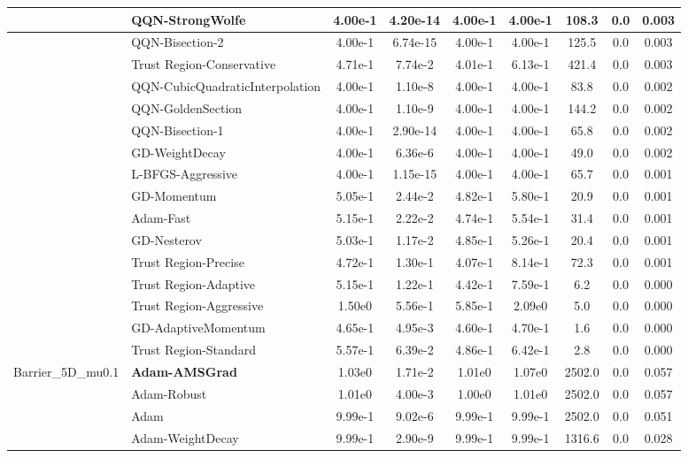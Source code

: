 \documentclass[10pt]{article}
\begin{document}
\begin{longtable}{|l|l|c|c|c|c|c|c|c|}
\hline
 & QQN-StrongWolfe & 4.00e-1 & 4.20e-14 & 4.00e-1 & 4.00e-1 & 108.3 & 0.0 & 0.003 \\
\hline
 & QQN-Bisection-2 & 4.00e-1 & 6.74e-15 & 4.00e-1 & 4.00e-1 & 125.5 & 0.0 & 0.003 \\
\hline
 & Trust Region-Conservative & 4.71e-1 & 7.74e-2 & 4.01e-1 & 6.13e-1 & 421.4 & 0.0 & 0.003 \\
\hline
 & QQN-CubicQuadraticInterpolation & 4.00e-1 & 1.10e-8 & 4.00e-1 & 4.00e-1 & 83.8 & 0.0 & 0.002 \\
\hline
 & QQN-GoldenSection & 4.00e-1 & 1.10e-9 & 4.00e-1 & 4.00e-1 & 144.2 & 0.0 & 0.002 \\
\hline
 & QQN-Bisection-1 & 4.00e-1 & 2.90e-14 & 4.00e-1 & 4.00e-1 & 65.8 & 0.0 & 0.002 \\
\hline
 & GD-WeightDecay & 4.00e-1 & 6.36e-6 & 4.00e-1 & 4.00e-1 & 49.0 & 0.0 & 0.002 \\
\hline
 & L-BFGS-Aggressive & 4.00e-1 & 1.15e-15 & 4.00e-1 & 4.00e-1 & 65.7 & 0.0 & 0.001 \\
\hline
 & GD-Momentum & 5.05e-1 & 2.44e-2 & 4.82e-1 & 5.80e-1 & 20.9 & 0.0 & 0.001 \\
\hline
 & Adam-Fast & 5.15e-1 & 2.22e-2 & 4.74e-1 & 5.54e-1 & 31.4 & 0.0 & 0.001 \\
\hline
 & GD-Nesterov & 5.03e-1 & 1.17e-2 & 4.85e-1 & 5.26e-1 & 20.4 & 0.0 & 0.001 \\
\hline
 & Trust Region-Precise & 4.72e-1 & 1.30e-1 & 4.07e-1 & 8.14e-1 & 72.3 & 0.0 & 0.001 \\
\hline
 & Trust Region-Adaptive & 5.15e-1 & 1.22e-1 & 4.42e-1 & 7.59e-1 & 6.2 & 0.0 & 0.000 \\
\hline
 & Trust Region-Aggressive & 1.50e0 & 5.56e-1 & 5.85e-1 & 2.09e0 & 5.0 & 0.0 & 0.000 \\
\hline
 & GD-AdaptiveMomentum & 4.65e-1 & 4.95e-3 & 4.60e-1 & 4.70e-1 & 1.6 & 0.0 & 0.000 \\
\hline
 & Trust Region-Standard & 5.57e-1 & 6.39e-2 & 4.86e-1 & 6.42e-1 & 2.8 & 0.0 & 0.000 \\
Barrier\_5D\_mu0.1 & \textbf{Adam-AMSGrad} & 1.03e0 & 1.71e-2 & 1.01e0 & 1.07e0 & 2502.0 & 0.0 & 0.057 \\
\hline
 & Adam-Robust & 1.01e0 & 4.00e-3 & 1.00e0 & 1.01e0 & 2502.0 & 0.0 & 0.057 \\
\hline
 & Adam & 9.99e-1 & 9.02e-6 & 9.99e-1 & 9.99e-1 & 2502.0 & 0.0 & 0.051 \\
\hline
 & Adam-WeightDecay & 9.99e-1 & 2.90e-9 & 9.99e-1 & 9.99e-1 & 1316.6 & 0.0 & 0.028 \\

\end{longtable}
\end{document}
